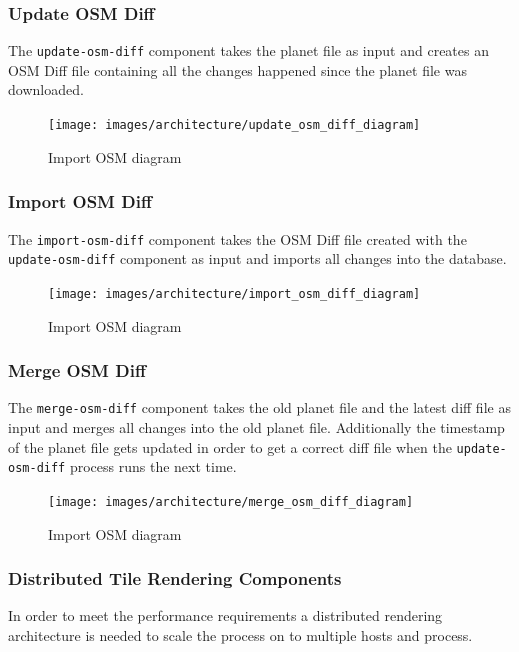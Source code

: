 \subsubsection{Update OSM Diff}

The \texttt{update-osm-diff} component takes the planet file as input and creates an OSM Diff file containing all the changes happened since the planet file was downloaded.

\begin{figure}[H]
  \centering
  \texttt{[image: images/architecture/update\_osm\_diff\_diagram]}
  \caption{Import OSM diagram}
\end{figure}

\subsubsection{Import OSM Diff}

The \texttt{import-osm-diff} component takes the OSM Diff file created with the \texttt{update-osm-diff} component as input and imports all changes into the database.

\begin{figure}[H]
  \centering
  \texttt{[image: images/architecture/import\_osm\_diff\_diagram]}
  \caption{Import OSM diagram}
\end{figure}

\subsubsection{Merge OSM Diff}

The \texttt{merge-osm-diff} component takes the old planet file and the latest diff file as input and merges all changes into the old planet file. Additionally the timestamp of the planet file gets updated in order to get a correct diff file when the \texttt{update-osm-diff} process runs the next time.

\begin{figure}[H]
  \centering
  \texttt{[image: images/architecture/merge\_osm\_diff\_diagram]}
  \caption{Import OSM diagram}
\end{figure}

\subsubsection{Distributed Tile Rendering Components}

In order to meet the performance requirements a distributed rendering architecture 
is needed to scale the process on to multiple hosts and process.

